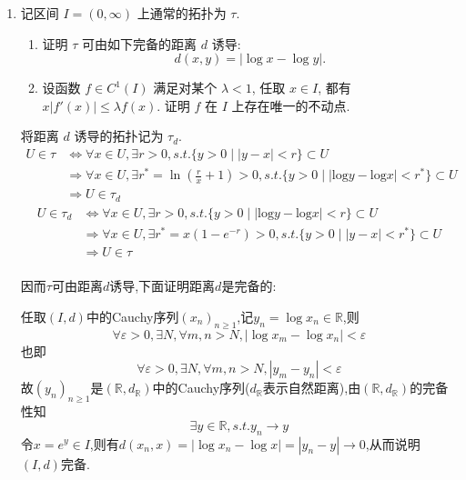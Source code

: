 \begin{enumerate}
      
  \item 记区间 $I=(0,\infty)$ 上通常的拓扑为 $\tau$.

    \begin{enumerate}
      \item 证明 $\tau$ 可由如下完备的距离 $d$ 诱导:
      \[d(x,y)=|\log x-\log y|.\]
    
      \item 设函数 $f\in C^1(I)$ 满足对某个 $\lambda<1$, 任取 $x\in I$, 都有
      $x|f'(x)|\leq\lambda f(x)$. 证明 $f$ 在 $I$ 上存在唯一的不动点.
    \end{enumerate}
    \begin{answer}
      将距离 $d$ 诱导的拓扑记为 $\tau _d$.
      \[\begin{split}U\in\tau&\Leftrightarrow\forall x\in U,\exists r>0,s.t.\{y>0\mid|y-x|<r\}\subset U\\&\Rightarrow\forall x\in U,\exists r^{*}=\ln\left( \frac{r}{x}+1\right)>0,s.t.\{y>0\mid|\textrm{log}y-\textrm{log}x|<r^{*}\}\subset U\\&\Rightarrow U\in\tau _d\end{split}\]
      \[\begin{split}U\in\tau_d&\Leftrightarrow\forall x\in U,\exists r>0,s.t.\{y>0\mid|\textrm{log}y-\textrm{log}x|<r\}\subset U\\&\Rightarrow\forall x\in U,\exists r^{*}=x(1-e^{-r})>0,s.t.\{y>0\mid|y-x|<r^{*}\}\subset U\\&\Rightarrow U\in\tau\end{split}\]\\
      因而$\tau$可由距离$d$诱导,下面证明距离$d$是完备的:

      任取$(I,d)$中的Cauchy序列$(x_n)_{n\geq 1}$,记$y_n=\log x_n\in\mathbb{R}$,则
      \[\forall\varepsilon >0,\exists N,\forall m,n>N,|\log x_m-\log x_n|<\varepsilon\]
      也即
      \[\forall\varepsilon >0,\exists N,\forall m,n>N,|y_m-y_n|<\varepsilon\]
      故$(y_n)_{n\geq 1}$是$(\mathbb{R},d_{\mathbb{R}})$中的Cauchy序列($d_{\mathbb{R}}$表示自然距离),由$(\mathbb{R},d_{\mathbb{R}})$的完备性知\[\exists y\in\mathbb{R},s.t.y_n\rightarrow y\]
      令$x=e^y\in I$,则有$d(x_n,x)=|\log x_n-\log x|=|y_n-y|\rightarrow 0$,从而说明$(I,d)$完备.


\end{answer}
\end{enumerate}
